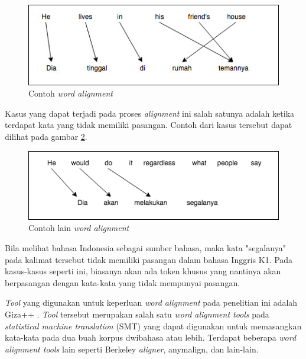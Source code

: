 \begin{figure}
	\centering
	\includegraphics[width=1\linewidth]{adit_pics/wordalignment.jpeg}
	\caption{Contoh \textit{word alignment}}
	\label{fig:word-alignment}
\end{figure}

Kasus yang dapat terjadi pada proses \textit{alignment} ini salah satunya adalah ketika terdapat kata yang tidak memiliki pasangan. Contoh dari kasus tersebut dapat dilihat pada gambar \ref{fig:word-alignment-2}.

\begin{figure}
	\centering
	\includegraphics[width=1\linewidth]{adit_pics/contoh_word_alignment_2.png}
	\caption{Contoh lain \textit{word alignment}}
	\label{fig:word-alignment-2}
\end{figure}

Bila melihat bahasa Indonesia sebagai sumber bahasa, maka kata "segalanya" pada kalimat tersebut tidak memiliki pasangan dalam bahasa Inggris K1. Pada kasus-kasus seperti ini, biasanya akan ada token khusus yang nantinya akan berpasangan dengan kata-kata yang tidak mempunyai pasangan.

\textit{Tool} yang digunakan untuk keperluan \textit{word alignment} pada penelitian ini adalah Giza++ \citep{och03:asc}. \textit{Tool} tersebut merupakan salah satu \textit{word alignment tools} pada \textit{statistical machine translation} (SMT) yang dapat digunakan untuk memasangkan kata-kata pada dua buah korpus dwibahasa atau lebih. Terdapat beberapa \textit{word alignment tools} lain seperti Berkeley \textit{aligner}, anymalign, dan lain-lain.

